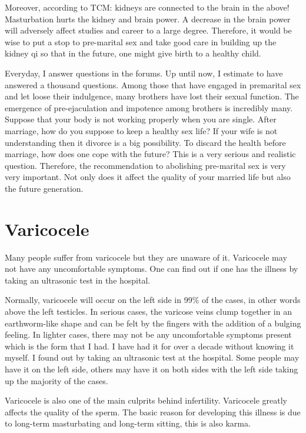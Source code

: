 \documentclass[
]{book}
\begin{document}
Moreover, according to TCM: kidneys are connected to the brain in the above! Masturbation hurts the kidney and brain power. A decrease in the brain power will adversely affect studies and career to a large degree. Therefore, it would be wise to put a stop to pre-marital sex and take good care in building up the kidney qi so that in the future, one might give birth to a healthy child.

Everyday, I answer questions in the forums. Up until now, I estimate to have answered a thousand questions. Among those that have engaged in premarital sex and let loose their indulgence, many brothers have lost their sexual function. The emergence of pre-ejaculation and impotence among brothers is incredibly many. Suppose that your body is not working properly when you are single. After marriage, how do you suppose to keep a healthy sex life? If your wife is not understanding then it divorce is a big possibility. To discard the health before marriage, how does one cope with the future? This is a very serious and realistic question. Therefore, the recommendation to abolishing pre-marital sex is very very important. Not only does it affect the quality of your married life but also the future generation.

\hypertarget{varicocele}{%
\section{Varicocele}\label{varicocele}}

Many people suffer from varicocele but they are unaware of it. Varicocele may not have any uncomfortable symptoms. One can find out if one has the illness by taking an ultrasonic test in the hospital.

Normally, varicocele will occur on the left side in 99\% of the cases, in other words above the left testicles. In serious cases, the varicose veins clump together in an earthworm-like shape and can be felt by the fingers with the addition of a bulging feeling. In lighter cases, there may not be any uncomfortable symptoms present which is the form that I had. I have had it for over a decade without knowing it myself. I found out by taking an ultrasonic test at the hospital. Some people may have it on the left side, others may have it on both sides with the left side taking up the majority of the cases.

Varicocele is also one of the main culprits behind infertility. Varicocele greatly affects the quality of the sperm. The basic reason for developing this illness is due to long-term masturbating and long-term sitting, this is also karma.
\end{document}
